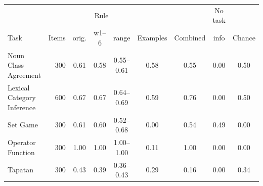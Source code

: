 \begin{tabular}{@{}lrccccccc@{}}
\toprule
 & & \multicolumn{3}{c}{Rule} & & & No task & \\
\cmidrule(lr){3-5}
Task & Items & orig. & w1--6 & range & Examples & Combined & info & Chance \\
\midrule
Noun Class Agreement & 300 & 0.61 & 0.58 & 0.55--0.61 & 0.58 & 0.55 & 0.00 & 0.50 \\
Lexical Category Inference & 600 & 0.67 & 0.67 & 0.64--0.69 & 0.59 & 0.76 & 0.00 & 0.50 \\
Set Game & 300 & 0.61 & 0.60 & 0.52--0.68 & 0.00 & 0.54 & 0.49 & 0.00 \\
Operator Function & 300 & 1.00 & 1.00 & 1.00--1.00 & 0.11 & 1.00 & 0.00 & 0.00 \\
Tapatan & 300 & 0.43 & 0.39 & 0.36--0.43 & 0.29 & 0.16 & 0.00 & 0.34 \\
\bottomrule
\end{tabular}
